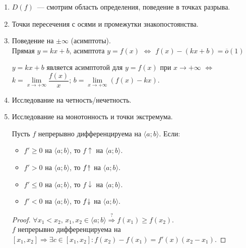 \documentclass[12pt]{article}
\newcommand{\twoheaduparrow}{\rotatebox[origin=c]{90}{$\twoheadrightarrow$}}
\newcommand{\twoheaddownarrow}{\rotatebox[origin=c]{-90}{$\twoheadrightarrow$}}
\begin{document}
	\begin{enumerate}
		\item $D(f)$~--- смотрим область определения, поведение в точках разрыва.
		\item Точки пересечения с осями и промежутки знакопостоянства.
		\item Поведение на $\pm \infty$ (асимптоты).\\
		Прямая $y = kx + b$, асимптота $y = f(x)$ $\Leftrightarrow$ $f(x) - (kx + b) = \overline{o}(1)$
		\begin{statement}
			$y = kx + b$ является асимптотой для $y = f(x)$ при $x \to +\infty$ $\Leftrightarrow$ $k = \lim\limits_{x \to +\infty} \dfrac{f(x)}{x}$; $b = \lim\limits_{x \to +\infty} (f(x) - kx)$.
		\end{statement}
		\item Исследование на четность/нечетность.
		\item Исследование на монотонность и точки экстремума.
		\begin{theorem}
			Пусть $f$ непрерывно дифференцируема на $\langle a; b \rangle$. Если:
			\begin{itemize}
				\item $f' \geqslant 0$ на $\langle a; b \rangle$, то $f \uparrow$ на $\langle a; b \rangle$.
				\item $f' > 0$ на $\langle a; b \rangle$, то $f \twoheaduparrow$ на $\langle a; b \rangle$.
				\item $f' \leqslant 0$ на $\langle a; b \rangle$, то $f \downarrow$ на $\langle a; b \rangle$.
				\item $f' < 0$ на $\langle a; b \rangle$, то $f \twoheaddownarrow$ на $\langle a; b \rangle$.
			\end{itemize}
		\end{theorem}
		\begin{proof}
			$\forall x_1 < x_2$, $x_1, x_2 \in \langle a; b \rangle \overset{?}{\Rightarrow} f(x_1) \geqslant f(x_2)$.\\
			$f$ непрерывно дифференцируема на $[x_1, x_2] \Rightarrow \exists c \in [x_1, x_2]: f(x_2) - f(x_1) = f'(x)(x_2 - x_1)$.
		\end{proof}
		

\end{enumerate}
\end{document}
